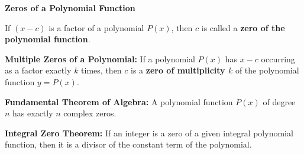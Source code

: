 \begin{center}
\textbf{Zeros of a Polynomial Function}
\end{center}

\vspace*{1ex}

If $(x-c)$ is a factor of a polynomial $P(x)$,  then $c$ is called a \textbf{zero of the polynomial function}.

\vspce 

\textbf{Multiple Zeros of a Polynomial:} If a polynomial $P(x)$ has $x-c$ occurring as a factor exactly $k$ times, then $c$ is a \textbf{zero of multiplicity $k$} of the polynomial function $y=P(x) $. 

\vspce 

\textbf{Fundamental Theorem of Algebra:} A polynomial function $P(x) $ of degree $n$ has exactly $n$ complex zeros. 

\vspce 

\textbf{Integral Zero Theorem: }If an integer is a zero of a given integral polynomial function, then it is a divisor of the constant term of the polynomial.

